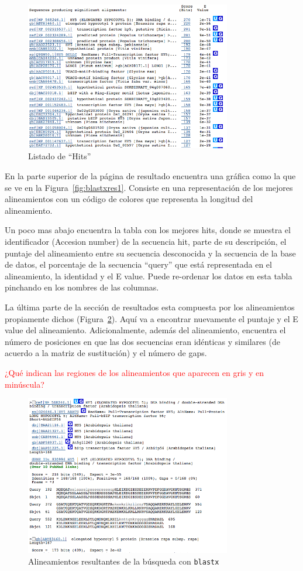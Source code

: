 \documentclass[letter,11pt]{book}
\begin{document}
\begin{figure}[h!]
\centering
 \includegraphics[width=9cm]{Figs/blastxres2.png}
 \caption[Resultados blast: hits]{\label{fig:blastxres2}Listado de ``Hits''}
\end{figure}

En la parte superior de la página de resultado encuentra una gráfica como la que se ve en la Figura~\ref{fig:blastxres1}. Consiste en una representación de los mejores alineamientos con un código de colores que representa la longitud del alineamiento.

Un poco mas abajo encuentra la tabla con  los mejores hits, donde se muestra el identificador (Accesion number) de la secuencia hit, parte de su descripción, el puntaje del alineamiento entre su secuencia desconocida y la secuencia de la base de datos, el porcentaje de la secuencia ``query'' que está representada en el alineamiento, la identidad y el E value. Puede re-ordenar los datos en esta tabla pinchando en los nombres de las columnas.

La última parte de la sección de resultados esta compuesta por los alineamientos propiamente dichos (Figura~\ref{fig:blastxres3}). Aquí va a encontrar nuevamente el puntaje y el E value del alineamiento. Adicionalmente, además del alineamiento, encuentra el número de posiciones en que las dos secuencias eran idénticas y similares (de acuerdo a la matriz de sustitución) y el número de gaps.

\textcolor{red}{¿Qué indican las regiones de los alineamientos que aparecen en gris y en minúscula?}

\begin{figure}[h!]
\centering
 \includegraphics[width=9cm]{Figs/blastxres3.png}
 \caption[Resultados blast: alineamientos]{\label{fig:blastxres3}Alineamientos resultantes de la búsqueda con \Verb+blastx+}
\end{figure}
\end{document}
